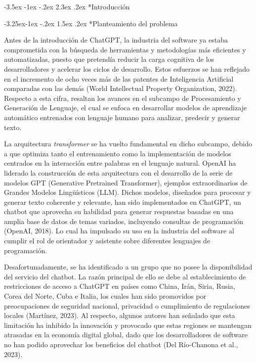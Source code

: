 \documentclass[12pt,a4paper]{article}
\makeatletter
\renewcommand\section{\@startsection{section}{1}{\z@}%
  {-3.5ex \@plus -1ex \@minus -.2ex}%
  {2.3ex \@plus.2ex}%
  {\normalfont\normalsize}}
\renewcommand\subsection{\@startsection{subsection}{2}{\z@}%
  {-3.25ex\@plus -1ex \@minus -.2ex}%
  {1.5ex \@plus .2ex}%
  {\normalfont\normalsize}}
\makeatother
\begin{document}
\clearpage
\pagestyle{plain}
\setcounter{page}{1}
{}
\section*{\centering\normalfont Introducción}


\subsection*{Planteamiento del problema}

Antes de la introducción de ChatGPT, la industria del software ya estaba comprometida con la búsqueda de herramientas y metodologías más eficientes y automatizadas, puesto que pretendía reducir la carga cognitiva de los desarrolladores y acelerar los ciclos de desarrollo. Estos esfuerzos se han reflejado en el incremento de ocho veces más de las patentes de Inteligencia Artificial comparadas con las demás (World Intellectual Property Organization, 2022). Respecto a esta cifra, resaltan los avances en el subcampo de Procesamiento y Generación de Lenguaje, el cual se enfoca en desarrollar modelos de aprendizaje automático entrenados con lenguaje humano para analizar, predecir y generar texto.

La arquitectura \textit{transformer} se ha vuelto fundamental en dicho subcampo, debido a que optimiza tanto el entrenamiento como la implementación de modelos centrados en la interacción entre palabras en el lenguaje natural. OpenAI ha liderado la construcción de esta arquitectura con el desarrollo de la serie de modelos GPT (Generative Pretrained Transformer), ejemplos extraordinarios de Grandes Modelos Lingüísticos (LLM). Dichos modelos, diseñados para procesar y generar texto coherente y relevante, han sido implementados en ChatGPT, un chatbot que aprovecha su habilidad para generar respuestas basadas en una amplia base de datos de temas variados, incluyendo consultas de programación (OpenAI, 2018). Lo cual ha impulsado su uso en la industria del software al cumplir el rol de orientador y asistente sobre diferentes lenguajes de programación.

Desafortunadamente, se ha identificado a un grupo que no posee la disponibilidad del servicio del chatbot. La razón principal de ello se debe al establecimiento de restricciones de acceso a ChatGPT en países como China, Irán, Siria, Rusia, Corea del Norte, Cuba e Italia, los cuales han sido promovidos por preocupaciones de seguridad nacional, privacidad o cumplimiento de regulaciones locales (Martínez, 2023). Al respecto, algunos autores han señalado que esta limitación ha inhibido la innovación y provocado que estas regiones se mantengan atrasadas en la economía digital global, dado que los desarrolladores de software no han podido aprovechar los beneficios del chatbot (Del Río-Chanona et al., 2023).
\end{document}
